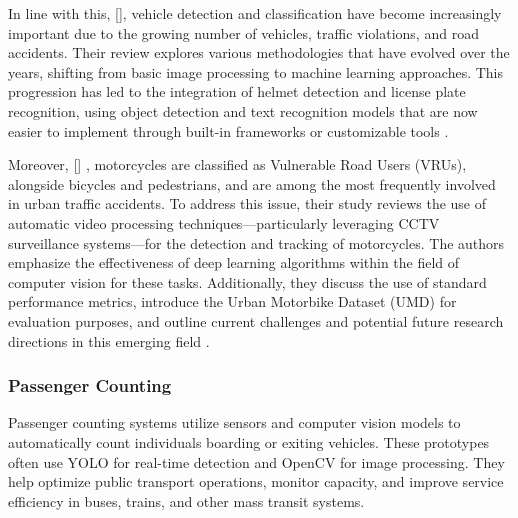 \begin{refsection}
{    In line with this,\citeauthor{Sanjana2021} [\citeyear{Sanjana2021}], vehicle detection and classification have become increasingly important due to the growing number of vehicles, traffic violations, and road accidents. Their review explores various methodologies that have evolved over the years, shifting from basic image processing to machine learning approaches. This progression has led to the integration of helmet detection and license plate recognition, using object detection and text recognition models that are now easier to implement through built-in frameworks or customizable tools \cite{Sanjana2021}.

    Moreover, \citeauthor{Espinosa2021} [\citeyear{Espinosa2021}] , motorcycles are classified as Vulnerable Road Users (VRUs), alongside bicycles and pedestrians, and are among the most frequently involved in urban traffic accidents. To address this issue, their study reviews the use of automatic video processing techniques—particularly leveraging CCTV surveillance systems—for the detection and tracking of motorcycles. The authors emphasize the effectiveness of deep learning algorithms within the field of computer vision for these tasks. Additionally, they discuss the use of standard performance metrics, introduce the Urban Motorbike Dataset (UMD) for evaluation purposes, and outline current challenges and potential future research directions in this emerging field \cite{Espinosa2021}.

\subsubsection{Passenger Counting}
    Passenger counting systems utilize sensors and computer vision models to automatically count individuals boarding or exiting vehicles. These prototypes often use YOLO for real-time detection and OpenCV for image processing. They help optimize public transport operations, monitor capacity, and improve service efficiency in buses, trains, and other mass transit systems.

}
\end{refsection}
